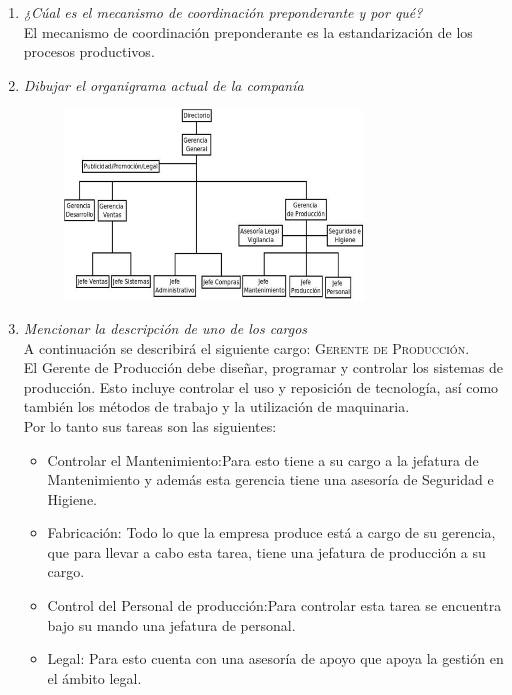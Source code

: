 \documentclass[a4paper,10pt]{article}
\begin{document}
\begin{enumerate}
			
			\item \textit{¿Cúal es el mecanismo de coordinación preponderante y por qué?}\\
			El mecanismo de coordinación preponderante es la estandarización de los procesos productivos.\\
						
			\item \textit{Dibujar el organigrama actual de la companía}\\
			\begin{figure}[!h]
			\includegraphics[width=0.75\textwidth]{imagenes/orgaLosGringos.png}
			\end{figure}			
			\item \textit{Mencionar la descripción de uno de los cargos}\\
			A continuación se describirá el siguiente cargo: \textsc{Gerente de Producción}.\\
			El Gerente de Producción debe diseñar, programar y controlar los sistemas de producción. Esto incluye controlar el uso y reposición de tecnología, así como también los métodos de trabajo y la utilización de maquinaria.\\
			Por lo tanto sus tareas son las siguientes:
			\begin{itemize}
				\item Controlar el Mantenimiento:Para esto tiene a su cargo a la jefatura de Mantenimiento  y además esta gerencia tiene una asesoría de Seguridad e Higiene.
				\item Fabricación: Todo lo que la empresa produce está a cargo de su gerencia, que para llevar a cabo esta tarea, tiene una jefatura de producción a su cargo.
				\item Control del Personal de producción:Para controlar esta tarea se encuentra bajo su mando una jefatura de personal.
				\item Legal: Para esto cuenta con una asesoría de apoyo que apoya la gestión en el ámbito legal.
			\end{itemize}
			

\end{enumerate}
\end{document}
